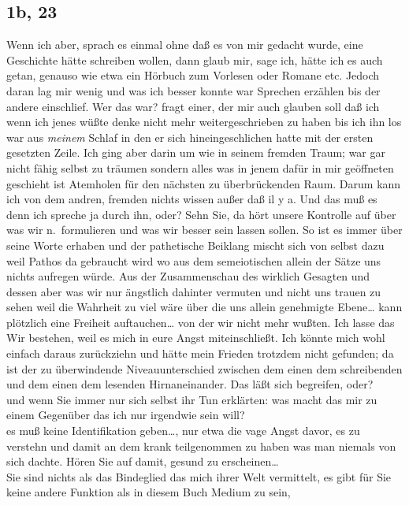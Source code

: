 \documentclass[
]{article}
\author{}
\date{\vspace{-2.5em}}
\begin{document}
\subsection{1b, 23}\label{b-23}

Wenn ich aber, sprach es einmal ohne daß es von mir gedacht wurde, eine
Geschichte hätte schreiben wollen, dann glaub mir, sage ich, hätte ich
es auch getan, genauso wie etwa ein Hörbuch zum Vorlesen oder Romane
etc. Jedoch daran lag mir wenig und was ich besser konnte war Sprechen
erzählen bis der andere einschlief. Wer das war? fragt einer, der mir
auch glauben soll daß ich wenn ich jenes wüßte denke nicht mehr
weitergeschrieben zu haben bis ich ihn los war aus \emph{meinem }Schlaf
in den er sich hineingeschlichen hatte mit der ersten gesetzten Zeile.
Ich ging aber darin um wie in seinem fremden Traum; war gar nicht fähig
selbst zu träumen sondern alles was in jenem dafür in mir geöffneten
geschieht ist Atemholen für den nächsten zu überbrückenden Raum. Darum
kann ich von dem andren, fremden nichts wissen außer daß il y a. Und das
muß es denn ich spreche ja durch ihn, oder? Sehn Sie, da hört unsere
Kontrolle auf über was wir n.~formulieren und was wir besser sein lassen
sollen. So ist es immer über seine Worte erhaben und der pathetische
Beiklang mischt sich von selbst dazu weil Pathos da gebraucht wird wo
aus dem semeiotischen allein der Sätze uns nichts aufregen würde. Aus
der Zusammenschau des wirklich Gesagten und dessen aber was wir nur
ängstlich dahinter vermuten und nicht uns trauen zu sehen weil die
Wahrheit zu viel wäre über die uns allein genehmigte Ebene\ldots{} kann
plötzlich eine Freiheit auftauchen\ldots{} von der wir nicht mehr
wußten. Ich lasse das Wir bestehen, weil es mich in eure Angst
miteinschließt. Ich könnte mich wohl einfach daraus zurückziehn und
hätte mein Frieden trotzdem nicht gefunden; da ist der zu überwindende
Niveauunterschied zwischen dem einen dem schreibenden und dem einen dem
lesenden Hirnaneinander. Das läßt sich begreifen, oder?\\
und wenn Sie immer nur sich selbst ihr Tun erklärten: was macht das mir
zu einem Gegenüber das ich nur irgendwie sein will?\\
es muß keine Identifikation geben\ldots, nur etwa die vage Angst davor,
es zu verstehn und damit an dem krank teilgenommen zu haben was man
niemals von sich dachte. Hören Sie auf damit, gesund zu
erscheinen\ldots{}\\
Sie sind nichts als das Bindeglied das mich ihrer Welt vermittelt, es
gibt für Sie keine andere Funktion als in diesem Buch Medium zu sein,
\end{document}
